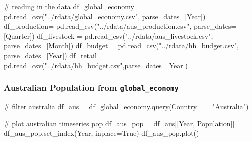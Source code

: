 \documentclass[
  11pt,
]{article}
\newenvironment{Shaded}{\begin{snugshade}}{\end{snugshade}}
\newcommand{\CommentTok}[1]{\textcolor[rgb]{0.37,0.37,0.37}{#1}}
\newcommand{\NormalTok}[1]{\textcolor[rgb]{0.00,0.23,0.31}{#1}}
\newcommand{\OperatorTok}[1]{\textcolor[rgb]{0.37,0.37,0.37}{#1}}
\newcommand{\StringTok}[1]{\textcolor[rgb]{0.13,0.47,0.30}{#1}}
\newcommand{\VariableTok}[1]{\textcolor[rgb]{0.07,0.07,0.07}{#1}}
\begin{document}
\begin{Shaded}
\begin{Highlighting}[]
\CommentTok{\# reading in the data}
\NormalTok{df\_global\_economy }\OperatorTok{=}\NormalTok{ pd.read\_csv(}\StringTok{"../rdata/global\_economy.csv"}\NormalTok{, parse\_dates}\OperatorTok{=}\NormalTok{[}\StringTok{\textquotesingle{}Year\textquotesingle{}}\NormalTok{])}
\NormalTok{df\_production}\OperatorTok{=}\NormalTok{ pd.read\_csv(}\StringTok{"../rdata/aus\_production.csv"}\NormalTok{, parse\_dates}\OperatorTok{=}\NormalTok{[}\StringTok{\textquotesingle{}Quarter\textquotesingle{}}\NormalTok{])}
\NormalTok{df\_livestock }\OperatorTok{=}\NormalTok{ pd.read\_csv(}\StringTok{"../rdata/aus\_livestock.csv"}\NormalTok{, parse\_dates}\OperatorTok{=}\NormalTok{[}\StringTok{\textquotesingle{}Month\textquotesingle{}}\NormalTok{])}
\NormalTok{df\_budget }\OperatorTok{=}\NormalTok{ pd.read\_csv(}\StringTok{"../rdata/hh\_budget.csv"}\NormalTok{, parse\_dates}\OperatorTok{=}\NormalTok{[}\StringTok{\textquotesingle{}Year\textquotesingle{}}\NormalTok{])}
\NormalTok{df\_retail }\OperatorTok{=}\NormalTok{ pd.read\_csv(}\StringTok{"../rdata/hh\_budget.csv"}\NormalTok{,parse\_dates}\OperatorTok{=}\NormalTok{[}\StringTok{\textquotesingle{}Year\textquotesingle{}}\NormalTok{])}
\end{Highlighting}
\end{Shaded}

\subsubsection{\texorpdfstring{Australian Population from
\texttt{global\_economy}}{Australian Population from global\_economy}}\label{australian-population-from-global_economy}

\begin{Shaded}
\begin{Highlighting}[]
\CommentTok{\# filter australia}
\NormalTok{df\_aus }\OperatorTok{=}\NormalTok{ df\_global\_economy.query(}\StringTok{\textquotesingle{}Country == "Australia"\textquotesingle{}}\NormalTok{)}
\end{Highlighting}
\end{Shaded}

\begin{Shaded}
\begin{Highlighting}[]
\CommentTok{\# plot australian timeseries pop}
\NormalTok{df\_aus\_pop }\OperatorTok{=}\NormalTok{ df\_aus[[}\StringTok{\textquotesingle{}Year\textquotesingle{}}\NormalTok{, }\StringTok{\textquotesingle{}Population\textquotesingle{}}\NormalTok{]]}
\NormalTok{df\_aus\_pop.set\_index(}\StringTok{\textquotesingle{}Year\textquotesingle{}}\NormalTok{, inplace}\OperatorTok{=}\VariableTok{True}\NormalTok{)}
\NormalTok{df\_aus\_pop.plot()}
\end{Highlighting}
\end{Shaded}
\end{document}

